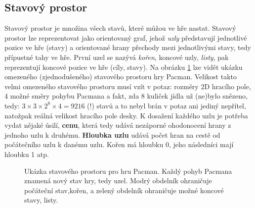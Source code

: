 \subsection*{Stavový prostor}
Stavový prostor \cite{AI1} je množina všech stavů, které můžou ve hře nastat. Stavový prostor lze reprezentovat jako orientovaný graf, jehož \textit{uzly} představují jednotlivé pozice ve hře (stavy) a orientované hrany přechody mezi jednotlivými stavy, tedy přípustné tahy ve hře. První uzel se nazývá \textit{kořen}, koncové uzly, \textit{listy}, pak reprezentují koncové pozice ve hře (cíly, stavy). Na obrázku \ref{img:stavp} lze vidět ukázku omezeného (zjednodušeného) stavového prostoru hry Pacman. Velikost takto velmi omezeného stavového prostoru musí vzít v potaz: rozměry 2D hracího pole, 4 možné směry pohybu Pacmana a fakt, zda 8 kuliček jídla už (ne)bylo snězeno, tedy:  $3 \times 3 \times 2^{8} \times 4 = 9216$ (!) stavů a to nebyl brán v potaz ani jediný nepřítel, natožpak reálná velikost hracího pole desky.
\newline
K dosažení každého uzlu je potřeba vydat nějaké úsilí, \textbf{cenu}, která tedy udává nezáporné ohodonocení hrany z jednoho uzlu k druhému. \textbf{Hloubka uzlu} udává počet hran na cestě od počátečního uzlu k danému uzlu. Kořen má hloubku 0, jeho následníci mají hloubku 1 atp.


\begin{figure}[h]
\begin{center}
	\caption{Ukázka stavového prostoru pro hru Pacman. Každý pohyb Pacmana znamená nový stav hry, tedy uzel. Modrý obdelník ohraničuje počáteční stav,kořen, a zelený obdelník ohraničuje možné koncové stavy, listy.}
	\label{img:stavp}
\end{center}
\end{figure}


